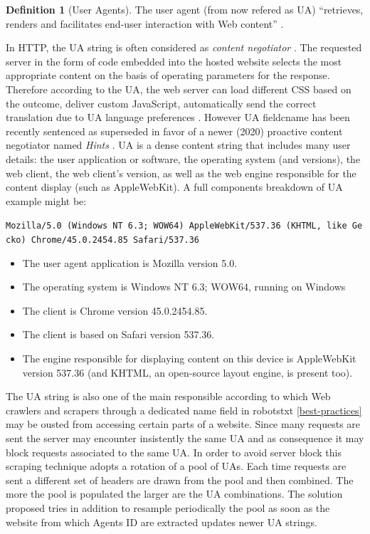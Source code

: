 \documentclass[
  12pt,
  a4paper,
  oneside]{book}
\providecommand{\tightlist}{%
  \setlength{\itemsep}{0pt}\setlength{\parskip}{0pt}}
\theoremstyle{definition}
\newtheorem{definition}{Definition}[chapter]
\theoremstyle{definition}
\theoremstyle{definition}
\theoremstyle{remark}
\begin{document}
\begin{definition}[User Agents]
\protect\hypertarget{def:useragents}{}{\label{def:useragents} {} }The user agent (from now refered as UA) ``retrieves, renders and facilitates end-user interaction with Web content'' \citet{UaDef}.
\end{definition}

In HTTP, the UA string is often considered as \emph{content negotiator} \citep{wiki:UserAgent}. The requested server in the form of code embedded into the hosted website selects the most appropriate content on the basis of operating parameters for the response. Therefore according to the UA, the web server can load different CSS based on the outcome, deliver custom JavaScript, automatically send the correct translation due to UA language preferences \citep{whoishostingthis.com}.
However UA fieldcname has been recently sentenced as superseded in favor of a newer (2020) proactive content negotiator named \emph{Hints} \citet{wiki:UserAgentHints}.
UA is a dense content string that includes many user details: the user application or software, the operating system (and versions), the web client, the web client's version, as well as the web engine responsible for the content display (such as AppleWebKit).
A full components breakdown of UA example might be:

\texttt{Mozilla/5.0\ (Windows\ NT\ 6.3;\ WOW64)\ AppleWebKit/537.36\ (KHTML,\ like\ Gecko)\ Chrome/45.0.2454.85\ Safari/537.36}

\begin{itemize}
\tightlist
\item
  The user agent application is Mozilla version 5.0.
\item
  The operating system is Windows NT 6.3; WOW64, running on Windows
\item
  The client is Chrome version 45.0.2454.85.
\item
  The client is based on Safari version 537.36.
\item
  The engine responsible for displaying content on this device is AppleWebKit version 537.36 (and KHTML, an open-source layout engine, is present too).
\end{itemize}

The UA string is also one of the main responsible according to which Web crawlers and scrapers through a dedicated name field in robotstxt \ref{best-practices} may be ousted from accessing certain parts of a website. Since many requests are sent the server may encounter insistently the same UA and as consequence it may block requests associated to the same UA. In order to avoid server block this scraping technique adopts a rotation of a pool of UAs. Each time requests are sent a different set of headers are drawn from the pool and then combined. The more the pool is populated the larger are the UA combinations. The solution proposed tries in addition to resample periodically the pool as soon as the website from which Agents ID are extracted updates newer UA strings.
\end{document}
